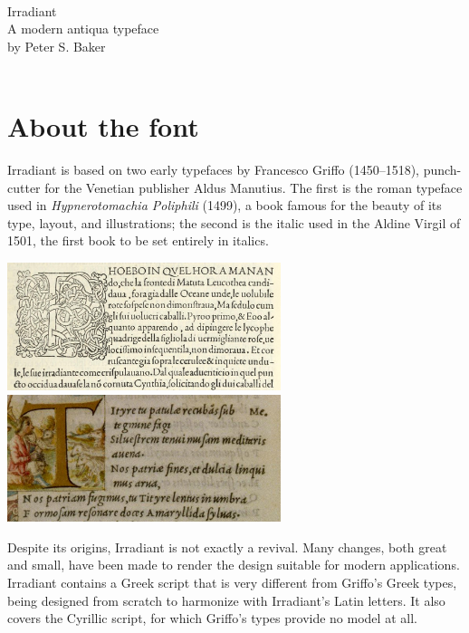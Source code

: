 \documentclass[12pt]{book}
\begin{document}
\begin{titlepage}
\hrulefill\\
\Huge \centering \textcolor{BrickRed}{Irradiant} \\[1cm]
\huge \centering A modern antiqua typeface \\[1cm]
\large \centering by {Peter S. Baker}\\[1cm]
\huge{} \\
\hrulefill
\end{titlepage}
\cleardoublepage

\section*{About the font}

Irradiant is based on two early typefaces by Francesco Griffo
(1450–1518), punch-cutter for the Venetian publisher Aldus Manutius. The
first is the roman typeface used in \textit{Hypnerotomachia Poliphili}
(1499), a book famous for the beauty of its type, layout, and
illustrations; the second is the italic used in the Aldine Virgil of
1501, the first book to be set entirely in italics.

\begin{center}
\includegraphics[width=0.6\textwidth]{hypnerotomachia_sample}\\[1ex]

\includegraphics[width=0.6\textwidth]{Virgil_sample}
\end{center}

Despite its origins, Irradiant is not exactly a revival. Many changes,
both great and small, have been made to render the design suitable for modern
applications. Irradiant contains a Greek script that is very different
from Griffo's Greek types, being designed from scratch to harmonize
with Irradiant's Latin letters. It also covers the Cyrillic script, for which 
Griffo’s types provide no model at all.
\end{document}

